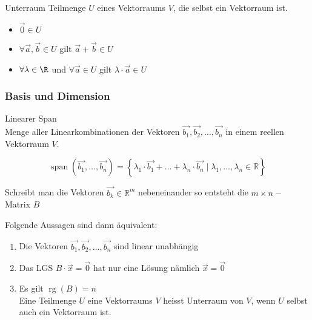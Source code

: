 \begin{definition}{Unterraum}
    Teilmenge $U$ eines Vektorraums $V$, die selbst ein Vektorraum ist.
    \begin{itemize}
        \item $\overrightarrow{0} \in U$
        \item $\forall \vec{a}, \vec{b} \in U$ gilt $\overrightarrow{a} + \overrightarrow{b} \in U$
        \item $\forall \lambda \in \R$ und $\forall \vec{a} \in U$ gilt $\lambda \cdot \overrightarrow{a} \in U$
    \end{itemize}
    
\end{definition}

\subsubsection*{Basis und Dimension}

\begin{definition}{Linearer Span}\\
    Menge aller Linearkombinationen der Vektoren $\overrightarrow{b_{1}}, \overrightarrow{b_{2}}, \ldots, \overrightarrow{b_{n}}$ in einem reellen Vektorraum $V$.

    $$
    \operatorname{span}\left(\overrightarrow{b_{1}}, \ldots, \overrightarrow{b_{n}}\right)=\left\{\lambda_{1} \cdot \overrightarrow{b_{1}}+ \ldots +\lambda_{n} \cdot \overrightarrow{b_{n}} \mid \lambda_{1}, \ldots, \lambda_{n} \in \mathbb{R}\right\}
    $$

    Schreibt man die Vektoren $\overrightarrow{b_{k}} \in \mathbb{R}^{m}$ nebeneinander so entsteht die $m \times n-$ Matrix $B$

    Folgende Aussagen sind dann äquivalent:

    \begin{enumerate}
    \item Die Vektoren $\overrightarrow{b_{1}}, \overrightarrow{b_{2}}, \ldots, \overrightarrow{b_{n}}$ sind linear unabhängig

    \item Das LGS $B \cdot \vec{x}=\overrightarrow{0}$ hat nur eine Lösung nämlich $\vec{x}=\overrightarrow{0}$

    \item Es gilt $\operatorname{rg}(B)=n$\\
    Eine Teilmenge $U$ eine Vektorraums $V$ heisst Unterraum von $V$, wenn $U$ selbst auch ein Vektorraum ist.

    \end{enumerate}
\end{definition}

